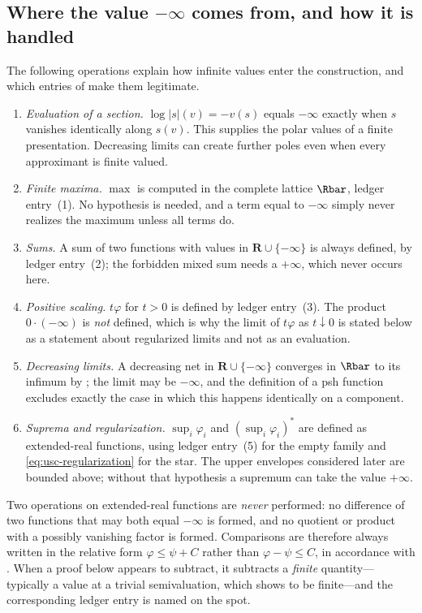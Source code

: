 \subsection{Where the value \texorpdfstring{$-\infty$}{-infinity} comes from,
and how it is handled}
\label{sec:ch34-minus-infinity}

The following operations explain how infinite values enter the
construction, and which entries of
 make them legitimate.

\begin{enumerate}
\item \emph{Evaluation of a section.}  $\log|s|(v)=-v(s)$ equals
  $-\infty$ exactly when $s$ vanishes identically along $s(v)$.  This
  supplies the polar values of a finite presentation.  Decreasing limits
  can create further poles even when every approximant is finite valued.
\item \emph{Finite maxima.}  $\max$ is computed in the complete lattice
  $\Rbar$, ledger entry~(1).  No hypothesis is needed, and a term equal to
  $-\infty$ simply never realizes the maximum unless all terms do.
\item \emph{Sums.}  A sum of two functions with values in
  $\mathbf R\cup\{-\infty\}$ is always defined, by ledger entry~(2); the
  forbidden mixed sum needs a $+\infty$, which never occurs here.
\item \emph{Positive scaling.}  $t\varphi$ for $t>0$ is defined by
  ledger entry~(3).  The product $0\cdot(-\infty)$ is \emph{not} defined,
  which is why the limit of $t\varphi$ as $t\downarrow0$ is stated below
  as a statement about regularized limits and not as an evaluation.
\item \emph{Decreasing limits.}  A decreasing net in
  $\mathbf R\cup\{-\infty\}$ converges in $\Rbar$ to its infimum by
  ; the limit may be $-\infty$, and the
  definition of a psh function excludes exactly the case in which this
  happens identically on a component.
\item \emph{Suprema and regularization.}  $\sup_i\varphi_i$ and
  $(\sup_i\varphi_i)^*$ are defined as extended-real functions, using
  ledger entry~(5) for the empty family and \eqref{eq:usc-regularization}
  for the star.  The upper envelopes considered later are bounded above;
  without that hypothesis a supremum can take the value $+\infty$.
\end{enumerate}

Two operations on extended-real functions are \emph{never} performed: no difference of two functions
that may both equal $-\infty$ is formed, and no quotient or product with a
possibly vanishing factor is formed.  Comparisons are therefore always
written in the relative form $\varphi\le\psi+C$ rather than
$\varphi-\psi\le C$, in accordance with
.  When a proof below appears to subtract,
it subtracts a \emph{finite} quantity---typically a value at a trivial
semivaluation, which  shows to be
finite---and the corresponding ledger entry is named on the spot.

